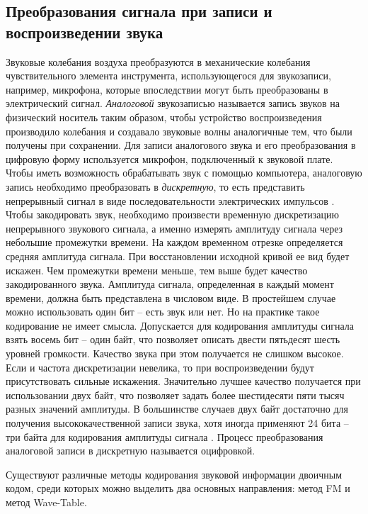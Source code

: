 \subsection{Преобразования сигнала при записи и воспроизведении звука} 

Звуковые колебания воздуха преобразуются в механические колебания чувствительного элемента инструмента, использующегося для звукозаписи, например, микрофона, которые впоследствии могут быть преобразованы в электрический сигнал. \textit{Аналоговой} звукозаписью называется запись звуков на физический носитель таким образом, чтобы устройство воспроизведения производило колебания и создавало звуковые волны аналогичные тем, что были получены при сохранении. Для записи аналогового звука и его преобразования в цифровую форму используется микрофон, подключенный к звуковой плате. Чтобы иметь возможность обрабатывать звук с помощью компьютера, аналоговую запись необходимо преобразовать в \textit{дискретную}, то есть представить непрерывный сигнал в виде последовательности электрических импульсов \cite{Sound}. Чтобы закодировать звук, необходимо произвести временную дискретизацию непрерывного звукового сигнала, а именно измерять амплитуду сигнала через небольшие промежутки времени. На каждом временном отрезке определяется средняя амплитуда сигнала. При восстановлении исходной кривой ее вид будет искажен. Чем промежутки времени меньше, тем выше будет качество закодированного звука. 
Амплитуда сигнала, определенная в каждый момент времени, должна быть представлена в числовом виде. В простейшем случае можно использовать один бит – есть звук или нет. Но на практике такое кодирование не имеет смысла. Допускается для кодирования амплитуды сигнала взять восемь бит – один байт, что позволяет описать двести пятьдесят шесть уровней громкости. Качество звука при этом получается не слишком высокое. Если и частота дискретизации невелика, то при воспроизведении будут присутствовать сильные искажения. Значительно лучшее качество получается при использовании двух байт, что позволяет задать более шестидесяти пяти тысяч разных значений амплитуды. В большинстве случаев двух байт достаточно для получения высококачественной записи звука, хотя иногда применяют 24 бита – три байта для кодирования амплитуды сигнала \cite{PDAC}.
Процесс преобразования аналоговой записи в дискретную называется оцифровкой.

Существуют различные методы кодирования звуковой информации двоичным кодом, среди которых можно выделить два основных направления: метод FM и метод Wave-Table.

